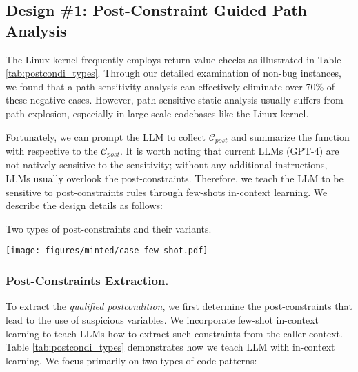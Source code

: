 \subsection{Design \#1: Post-Constraint Guided Path Analysis}
\label{subsec:postcondi}

The Linux kernel frequently employs return value checks as illustrated in Table \ref{tab:postcondi_types}. Through our detailed examination of non-bug instances, we found that 
a path-sensitivity analysis can effectively eliminate over 70\% of these negative cases. However, path-sensitive static analysis usually suffers from path explosion, especially in large-scale codebases like the Linux kernel.

Fortunately, we can prompt the LLM to collect \(\mathcal{C}_{post}\) and summarize the function with respective to the 
\(\mathcal{C}_{post}\). It is worth noting that current LLMs (\eg GPT-4) are not natively sensitive to the sensitivity; without any additional instructions, LLMs usually overlook the post-constraints.
Therefore, we teach the LLM to be sensitive to post-constraints rules through few-shots in-context learning. We describe the design details as follows:



\begin{table}

\caption{Two types of post-constraints and their variants.}
\label{tab:postcondi_types}
\vspace{-3pt}
\texttt{[image: figures/minted/case\_few\_shot.pdf]}
\end{table}

\subsubsection{Post-Constraints Extraction.} 
To extract the \textit{qualified postcondition}, we first determine the post-constraints that lead to the use of suspicious variables.
We incorporate few-shot in-context learning to teach LLMs how to extract such constraints from the caller context. Table \ref{tab:postcondi_types} demonstrates how we teach LLM with in-context learning. We focus primarily on two types of code patterns:

